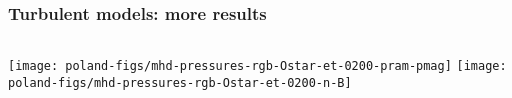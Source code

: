 \documentclass[presentation]{beamer}
\begin{document}
\begin{frame}
  \frametitle{Turbulent models: more results}
  \begin{columns}
    \texttt{[image: poland-figs/mhd-pressures-rgb-Ostar-et-0200-pram-pmag]}
    \texttt{[image: poland-figs/mhd-pressures-rgb-Ostar-et-0200-n-B]}
  \end{columns}
\end{frame}

\begin{frame}[plain]%
\hspace*{-1ex}
\end{frame}
\end{document}
